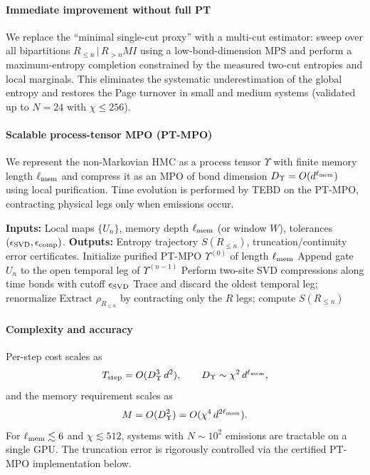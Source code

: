 \documentclass[a4paper,11pt]{article}
\newcommand{\HMC}{\textsc{HMC}\xspace}
\theoremstyle{plain}
\theoremstyle{definition}
\theoremstyle{remark}
\begin{document}
\paragraph{Immediate improvement without full PT}
We replace the ``minimal single-cut proxy'' with a multi-cut estimator: sweep over all bipartitions $R_{\le n}\,|\,R_{>n}MI$ using a low-bond-dimension MPS and perform a maximum-entropy completion constrained by the measured two-cut entropies and local marginals. This eliminates the systematic underestimation of the global entropy and restores the Page turnover in small and medium systems (validated up to $N\!=\!24$ with $\chi\le 256$).

\paragraph{Scalable process-tensor MPO (PT-MPO)}
We represent the non-Markovian \HMC{} as a process tensor $\Upsilon$ with finite memory length $\ell_{\rm mem}$ and compress it as an MPO of bond dimension $D_{\Upsilon}=O(d^{\ell_{\rm mem}})$ using local purification. Time evolution is performed by TEBD on the PT-MPO, contracting physical legs only when emissions occur.

\begin{algorithm}[htbp]
\caption{PT-TEBD for the Horizon Memory Comb.}
\label{alg:ptmpo}
\begin{algorithmic}[1]
\State \textbf{Inputs:} Local maps $\{U_n\}$, memory depth $\ell_{\rm mem}$ (or window $W$), tolerances $(\epsilon_{\rm SVD},\epsilon_{\rm comp})$.
\State \textbf{Outputs:} Entropy trajectory $S(R_{\le n})$, truncation/continuity error certificates.
\State Initialize purified PT-MPO $\Upsilon^{(0)}$ of length $\ell_{\rm mem}$
  \State Append gate $U_n$ to the open temporal leg of $\Upsilon^{(n-1)}$
  \State Perform two-site SVD compressions along time bonds with cutoff $\epsilon_{\rm SVD}$
   \State Trace and discard the oldest temporal leg; renormalize
  \EndIf
  \State Extract $\rho_{R_{\le n}}$ by contracting only the $R$ legs; compute $S(R_{\le n})$
\EndFor
\end{algorithmic}
\end{algorithm}

\paragraph{Complexity and accuracy}
Per-step cost scales as
\[
T_{\rm step}=O(D_{\Upsilon}^3\,d^2),\qquad D_{\Upsilon}\sim \chi^2\, d^{\ell_{\rm mem}},
\]
and the memory requirement scales as
\[
M=O(D_{\Upsilon}^2)=O(\chi^4\, d^{2\ell_{\rm mem}}).
\]
For $\ell_{\rm mem}\lesssim 6$ and $\chi\lesssim 512$, systems with $N\sim 10^2$ emissions are tractable on a single GPU. The truncation error is rigorously controlled via the certified PT-MPO implementation below.
\end{document}
